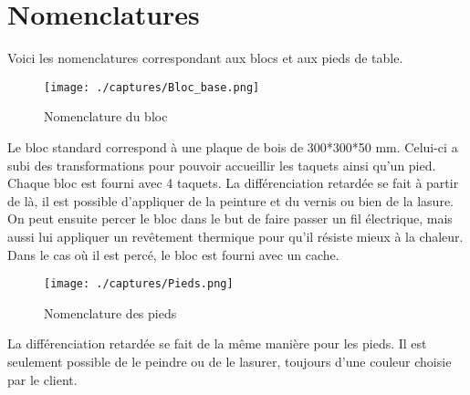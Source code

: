 \section{Nomenclatures}

Voici les nomenclatures correspondant aux blocs et aux pieds de table.

	\begin{figure}[H]
\centering
\texttt{[image: ./captures/Bloc\_base.png]}
\caption{Nomenclature du bloc}
	\end{figure}	

Le bloc standard correspond à une plaque de bois de 300*300*50 mm. Celui-ci a subi des transformations pour pouvoir accueillir les taquets ainsi qu'un pied. 
Chaque bloc est fourni avec 4 taquets. 
La différenciation retardée se fait à partir de là, il est possible d'appliquer de la peinture et du vernis ou bien de la lasure. On peut ensuite percer le bloc dans le but de faire passer un fil électrique, mais aussi lui appliquer un revêtement thermique pour qu'il résiste mieux à la chaleur. 
Dans le cas où il est percé, le bloc est fourni avec un cache.
	
		\begin{figure}[H]
\centering
\texttt{[image: ./captures/Pieds.png]}
\caption{Nomenclature des pieds}
	\end{figure}	

La différenciation retardée se fait de la même manière pour les pieds. Il est seulement possible de le peindre ou de le lasurer, toujours d'une couleur choisie par le client.